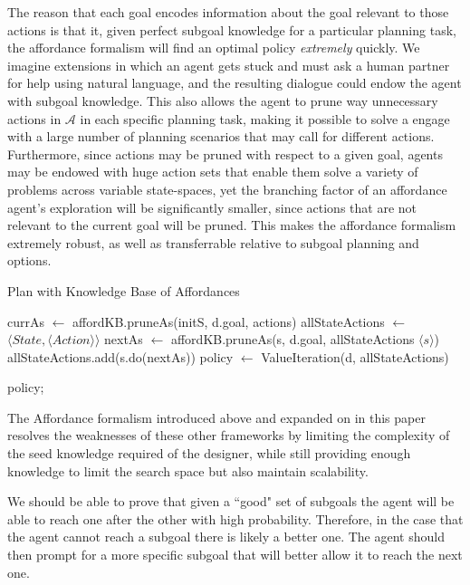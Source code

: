 \documentclass[]{article}
\begin{document}
The reason that each goal encodes information about the goal relevant to those actions is that it, given perfect subgoal knowledge for a particular planning task, the affordance formalism will find an optimal policy {\it extremely} quickly. We imagine extensions in which an agent gets stuck and must ask a human partner for help using natural language, and the resulting dialogue could endow the agent with subgoal knowledge. This also allows the agent to prune way unnecessary actions in $\mathcal{A}$ in each specific planning task, making it possible to solve a engage with a large number of planning scenarios that may call for different actions. Furthermore, since actions may be pruned with respect to a given goal, agents may be endowed with huge action sets that enable them solve a variety of problems across variable state-spaces, yet the branching factor of an affordance agent's exploration will be significantly smaller, since actions that are not relevant to the current goal will be pruned. This makes the affordance formalism extremely robust, as well as transferrable relative to subgoal planning and options.


\begin{algorithm}
  \caption{Plan with Knowledge Base of Affordances}

  \begin{algorithmic}
    \State {}
    \State currAs $\gets$ affordKB.pruneAs(initS, d.goal, actions)
    \State allStateActions $\gets$ $\langle State ,\langle Action \rangle \rangle$
	\State nextAs $\gets$ affordKB.pruneAs(s, d.goal, allStateActions $\langle s \rangle$)
	\State allStateActions.add(s.do(nextAs))
    \EndFor
    \State {}
    \State policy $\gets$ ValueIteration(d, allStateActions)
    
    \Return policy;
  \end{algorithmic}
\end{algorithm}


The Affordance formalism introduced above and expanded on in this paper resolves the weaknesses of these other frameworks by limiting the complexity of the seed knowledge required of the designer, while still providing enough knowledge to limit the search space but also maintain scalability.

We should be able to prove that given a ``good" set of subgoals the agent will be able to reach one after the other with high probability. Therefore, in the case that the agent cannot reach a subgoal there is likely a better one. The agent should then prompt for a more specific subgoal that will better allow it to reach the next one.
\end{document}
